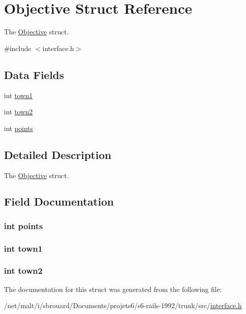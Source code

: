 \hypertarget{structObjective}{\section{Objective Struct Reference}
\label{structObjective}
}


The \hyperlink{structObjective}{Objective} struct.  




{\ttfamily \#include $<$interface.\-h$>$}

\subsection*{Data Fields}
\begin{DoxyCompactItemize}
\item 
int \hyperlink{structObjective_a98fff246793d7da82f5befd043b04451}{town1}
\item 
int \hyperlink{structObjective_a38f94b482519ddfc27b054eb3dde308e}{town2}
\item 
int \hyperlink{structObjective_af7f8f4a4e39e09fdb5e9f02330ecabef}{points}
\end{DoxyCompactItemize}


\subsection{Detailed Description}
The \hyperlink{structObjective}{Objective} struct. 

\subsection{Field Documentation}
\hypertarget{structObjective_af7f8f4a4e39e09fdb5e9f02330ecabef}{
\subsubsection[{points}]{\setlength{\rightskip}{0pt plus 5cm}int points}}\label{structObjective_af7f8f4a4e39e09fdb5e9f02330ecabef}
\hypertarget{structObjective_a98fff246793d7da82f5befd043b04451}{
\subsubsection[{town1}]{\setlength{\rightskip}{0pt plus 5cm}int town1}}\label{structObjective_a98fff246793d7da82f5befd043b04451}
\hypertarget{structObjective_a38f94b482519ddfc27b054eb3dde308e}{
\subsubsection[{town2}]{\setlength{\rightskip}{0pt plus 5cm}int town2}}\label{structObjective_a38f94b482519ddfc27b054eb3dde308e}


The documentation for this struct was generated from the following file\-:\begin{DoxyCompactItemize}
\item 
/net/malt/i/sbrouard/\-Documents/projets6/s6-\/rails-\/1992/trunk/src/\hyperlink{interface_8h}{interface.\-h}\end{DoxyCompactItemize}
